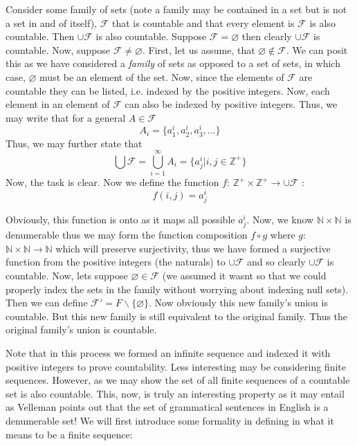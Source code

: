 \documentclass{article}
\begin{document}
\par Consider some family of sets (note a family may be contained in a set but is not a set in and of itself), $\mathcal{F}$ that is countable and that every element is $\mathcal{F}$ is also countable. Then $\cup \mathcal{F}$ is also countable. Suppose $\mathcal{F} = \varnothing$ then clearly $\cup \mathcal{F}$ is countable. Now, suppose $\mathcal{F} \not= \varnothing$. First, let us assume, that $\varnothing \not\in \mathcal{F}$. We can posit this as we have considered a \textit{family} of sets as opposed to a set of sets, in which case, $\varnothing$ must be an element of the set. Now, since the elements of $\mathcal{F}$ are countable they can be listed, i.e. indexed by the positive integers. Now, each element in an element of $\mathcal{F}$ can also be indexed by positive integers. Thus, we may write that for a general $A \in \mathcal{F}$
\[
A_{i}=\{a_1^i,a_2^i,a_3^i,...\}
\]
Thus, we may further state that
\[
\bigcup\mathcal{F}=\bigcup_{i=1}^{\infty} A_{i}=\{a_j^i |i,j \in \mathbb{Z}^{+}\}
\]
Now, the task is clear. Now we define the function $f$: $\mathbb{Z}^{+} \times \mathbb{Z}^{+} \to \cup \mathcal{F}$ :
\[
f(i,j)=a_{j}^{i}
\]
\par Obviously, this function is onto as it maps all possible $a_{j}^{i}$. Now, we know $\mathbb{N}\times\mathbb{N}$ is denumerable thus we may form the function composition $f \circ g$ where $g$: $\mathbb{N}\times \mathbb{N} \to \mathbb{N}$ which will preserve surjectivity, thus we have formed a surjective function from the positive integers (the naturals) to $\cup \mathcal{F}$ and so clearly $\cup \mathcal{F}$ is countable. Now, lets suppose $\varnothing \in \mathcal{F}$ (we assumed it wasnt so that we could properly index the sets in the family without worrying about indexing null sets). Then we can define $\mathcal{F'}=F \backslash \{\varnothing\}$. Now obviously this new family's union is countable. But this new family is still equivalent to the original family. Thus the original family's union is countable. 
\par Note that in this process we formed an infinite sequence and indexed it with positive integers to prove countability. Less interesting may be considering finite sequences. However, as we may show the set of all finite sequences of a countable set is also countable. This, now, is truly an interesting property as it may entail as Velleman points out that the set of grammatical sentences in English is a denumerable set! We will first introduce some formality in defining in what it means to be a finite sequence:
\end{document}
